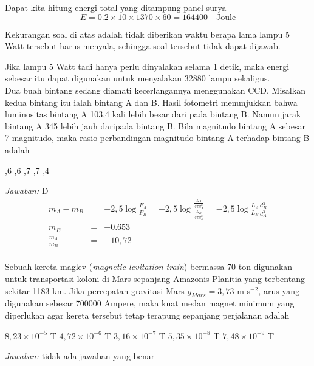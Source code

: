\documentclass[11pt,fleqn]{exam}
\begin{document}
\begin{questions}
Dapat kita hitung energi total yang ditampung panel surya
\begin{equation*}
E = 0.2 \times 10 \times 1370 \times 60 = 164400 \quad \text{Joule}
\end{equation*}

Kekurangan soal di atas adalah tidak diberikan waktu berapa lama lampu 5 Watt tersebut harus menyala, sehingga soal tersebut tidak dapat dijawab. 

Jika lampu 5 Watt tadi hanya perlu dinyalakan selama 1 detik, maka energi sebesar itu dapat digunakan untuk menyalakan 32880 lampu sekaligus.\\

\question Dua buah bintang sedang diamati kecerlangannya menggunakan CCD. Misalkan kedua bintang itu ialah bintang A dan B. Hasil fotometri menunjukkan bahwa luminositas bintang A 103,4 kali lebih besar dari pada bintang B. Namun jarak bintang A 345 lebih jauh daripada bintang B. Bila magnitudo bintang A sebesar 7 magnitudo, maka rasio perbandingan magnitudo bintang A terhadap bintang B adalah
\begin{choices}
,6
,6
,7
,7
,4
\end{choices}

\textit{Jawaban: } D\\
\begin{eqnarray*}
m_A - m_B &=& -2,5 \log{\frac{F_A}{F_B}} = -2,5 \log{\frac{\frac{L_A}{4\pi d_A^2}}{\frac{L_B}{4 \pi d_B^2}}} = -2,5 \log{\frac{L_A}{L_B} \frac{d_B^2}{d_A^2}}\\
m_B &=& -0.653\\
\frac{m_A}{m_B} &=& -10,72 
\end{eqnarray*}\\


\question Sebuah kereta maglev (\textit{magnetic levitation train}) bermassa 70 ton digunakan untuk transportasi koloni di Mars sepanjang Amazonis Planitia yang terbentang sekitar 1183 km. Jika percepatan gravitasi Mars $g_{Mars} = 3,73$ m s$^{-2}$, arus yang digunakan sebesar 700000 Ampere, maka kuat medan magnet minimum yang diperlukan agar kereta tersebut tetap terapung sepanjang perjalanan adalah
\begin{choices}
\choice $8,23 \times 10^{-5}$ T
\choice $4,72 \times 10^{-6}$ T
\choice $3,16 \times 10^{-7}$ T
\choice $5,35 \times 10^{-8}$ T
\choice $7,48 \times 10^{-9}$ T
\end{choices}

\textit{Jawaban: } tidak ada jawaban yang benar\\


\end{questions}
\end{document}
